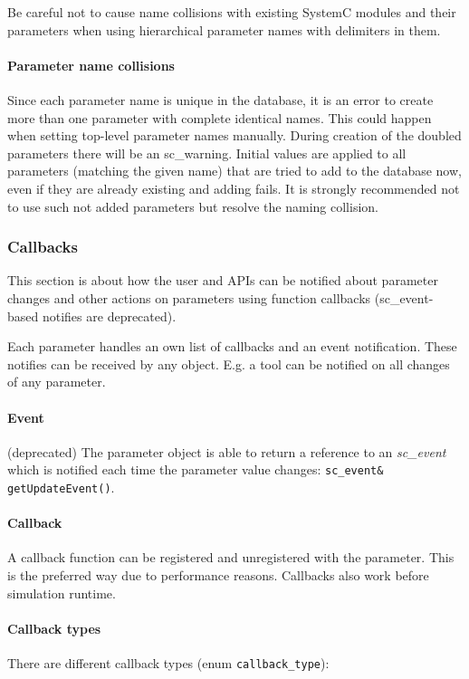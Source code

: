 \WarningSymbol{} Be careful not to cause name collisions with existing SystemC modules and their parameters when using hierarchical parameter names with delimiters in them.

\paragraph{Parameter name collisions} Since each parameter name is unique in the database, it is an error to create more than one parameter with complete identical names. This could happen when setting top-level parameter names manually. During creation of the doubled parameters there will be an sc\_warning. Initial values are applied to all parameters (matching the given name) that are tried to add to the database now, even if they are already existing and adding fails. It is strongly recommended not to use such not added parameters but resolve the naming collision.


\subsubsection{Callbacks}
\label{CallbacksAndNotifies}

This section is about how the user and APIs can be notified about parameter changes and other actions on parameters using function callbacks (sc\_event-based notifies are deprecated).

Each parameter handles an own list of callbacks and an event notification.
These notifies can be received by any object. E.g. a tool can be notified on all changes of any parameter.

\paragraph{Event} (deprecated) The parameter object is able to return a reference to an {\em sc\_event} which is notified each time the parameter value changes: \lstinline|sc_event& getUpdateEvent()|.

\paragraph{Callback} A callback function can be registered and unregistered with the parameter. This is the preferred way due to performance reasons. Callbacks also work before simulation runtime. 


\paragraph{Callback types} There are different callback types (enum \lstinline|callback_type|):

